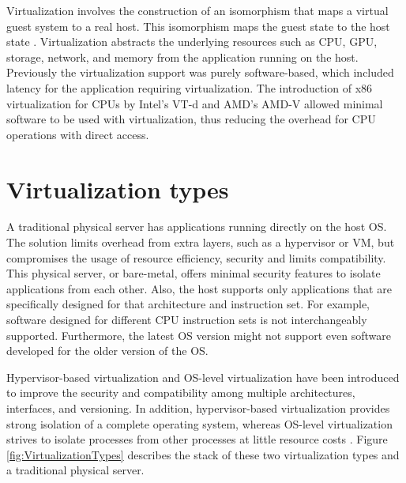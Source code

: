 Virtualization involves the construction of an isomorphism that maps a virtual guest system to a real host. This isomorphism maps the guest state to the host state \cite{Xing2012}. Virtualization abstracts the underlying resources such as CPU, GPU, storage, network, and memory from the application running on the host. Previously the virtualization support was purely software-based, which included latency for the application requiring virtualization. The introduction of x86 virtualization for CPUs by Intel's VT-d and AMD's AMD-V allowed minimal software to be used with virtualization, thus reducing the overhead for CPU operations with direct access.

\section{Virtualization types}

A traditional physical server has applications running directly on the host OS. The solution limits overhead from extra layers, such as a hypervisor or VM, but compromises the usage of resource efficiency, security and limits compatibility. This physical server, or bare-metal, offers minimal security features to isolate applications from each other. Also, the host supports only applications that are specifically designed for that architecture and instruction set. For example, software designed for different CPU instruction sets is not interchangeably supported. Furthermore, the latest OS version might not support even software developed for the older version of the OS.

Hypervisor-based virtualization and OS-level virtualization have been introduced to improve the security and compatibility among multiple architectures, interfaces, and versioning. In addition, hypervisor-based virtualization provides strong isolation of a complete operating system, whereas OS-level virtualization strives to isolate processes from other processes at little resource costs \cite{Eder2016}. Figure \ref{fig:VirtualizationTypes} describes the stack of these two virtualization types and a traditional physical server.

